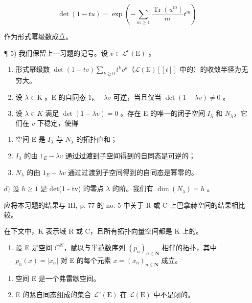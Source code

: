 \[
\det (1 - t u) = \exp \left(- \sum_ {m \geqslant 1} \frac {\operatorname{Tr} \left(u ^ {m}\right)}{m} t ^ {m}\right)
\]

作为形式幂级数成立。

¶ 5) 我们保留上一习题的记号。设 \(v \in \mathcal{L}^{\mathrm{c}}(\mathrm{E})\) 。

\begin{enumerate}
\def\labelenumi{\alph{enumi})}
\item
  形式幂级数 \(\det(1 - tv)\sum_{k\geqslant 0}t^{k}v^{k}\)（\(\mathcal{L}(\mathrm{E})[[t]]\) 中的）的收敛半径为无穷大。
\item
  设 \(\lambda \in \mathrm{K}\) 。E 的自同态 \(1_{\mathrm{E}} - \lambda v\) 可逆，当且仅当 \(\det(1 - \lambda v) \neq 0\) 。
\item
  设 \(\lambda \in K\) 满足 \(\det(1 - \lambda v) = 0\) 。存在 E 的唯一的闭子空间 \(I_{\lambda}\) 和 \(N_{\lambda}\)，它们在 \(v\) 下稳定，使得
\end{enumerate}

\begin{enumerate}
\def\labelenumi{(\roman{enumi})}
\item
  空间 E 是 \(I_{\lambda}\) 与 \(N_{\lambda}\) 的拓扑直和；
\item
  \(I_{\lambda}\) 的由 \(1_{E} - \lambda v\) 通过过渡到子空间得到的自同态是可逆的；
\item
  \(N_{\lambda}\) 的由 \(1_{E} - \lambda v\) 通过过渡到子空间得到的自同态是幂零的。
\end{enumerate}

\(d)\) 设 \(h \geqslant 1\) 是 det(1 - tv) 的零点 \(\lambda\) 的阶。我们有 \(\dim(N_{\lambda}) = h\) 。

应将本习题的结果与 III, p. 77 的 no. 5 中关于 R 或 C 上巴拿赫空间的结果相比较。

在下文中，K 表示域 R 或 C，且所有拓扑向量空间都是 K 上的。

\begin{enumerate}
\def\labelenumi{\arabic{enumi})}
\setcounter{enumi}{5}
\tightlist
\item
  设 E 是空间 \(C^{N}\)，赋以与半范数序列 \((p_{n})_{n\in\mathbf{N}}\) 相伴的拓扑，其中 \(p_{n}(x)=|x_{n}|\) 对 E 的每个元素 \(x=(x_{n})_{n\in\mathbf{N}}\) 成立。
\end{enumerate}

\begin{enumerate}
\def\labelenumi{\alph{enumi})}
\item
  空间 E 是一个弗雷歇空间。
\item
  E 的紧自同态组成的集合 \(\mathcal{L}^{\mathrm{c}}(\mathrm{E})\) 在 \(\mathcal{L}(\mathrm{E})\) 中不是闭的。
\end{enumerate}

